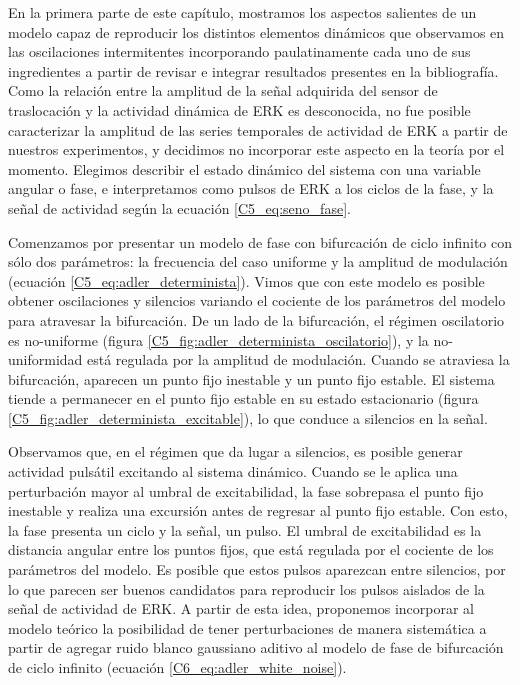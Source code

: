 \documentclass[./main.tex]{subfiles}
\begin{document}
En la primera parte de este capítulo, mostramos los aspectos salientes de un modelo capaz de reproducir los distintos elementos dinámicos que observamos en las oscilaciones intermitentes incorporando paulatinamente cada uno de sus ingredientes a partir de revisar e integrar resultados presentes en la bibliografía. Como la relación entre la amplitud de la señal adquirida del sensor de traslocación y la actividad dinámica de ERK es desconocida, no fue posible caracterizar la amplitud de las series temporales de actividad de ERK a partir de nuestros experimentos, y decidimos no incorporar este aspecto en la teoría por el momento. Elegimos describir el estado dinámico del sistema con una variable angular o fase, e interpretamos como pulsos de ERK a los ciclos de la fase, y la señal de actividad según la ecuación \ref{C5_eq:seno_fase}. 

Comenzamos por presentar un modelo de fase con bifurcación de ciclo infinito con sólo dos parámetros: la frecuencia del caso uniforme y la amplitud de modulación (ecuación \ref{C5_eq:adler_determinista}). Vimos que con este modelo es posible obtener oscilaciones y silencios variando el cociente de los parámetros del modelo para atravesar la bifurcación. De un lado de la bifurcación, el régimen oscilatorio es no-uniforme (figura \ref{C5_fig:adler_determinista_oscilatorio}), y la no-uniformidad está regulada por la amplitud de modulación. Cuando se atraviesa la bifurcación, aparecen un punto fijo inestable y un punto fijo estable. El sistema tiende a permanecer en el punto fijo estable en su estado estacionario (figura \ref{C5_fig:adler_determinista_excitable}), lo que conduce a silencios en la señal. 

Observamos que, en el régimen que da lugar a silencios, es posible generar actividad pulsátil excitando al sistema dinámico. Cuando se le aplica una perturbación mayor al umbral de excitabilidad, la fase sobrepasa el punto fijo inestable y realiza una excursión antes de regresar al punto fijo estable. Con esto, la fase presenta un ciclo y la señal, un pulso. El umbral de excitabilidad es la distancia angular entre los puntos fijos, que está regulada por el cociente de los parámetros del modelo. Es posible que estos pulsos aparezcan entre silencios, por lo que parecen ser buenos candidatos para reproducir los pulsos aislados de la señal de actividad de ERK. A partir de esta idea, proponemos incorporar al modelo teórico la posibilidad de tener perturbaciones de manera sistemática a partir de agregar ruido blanco gaussiano aditivo al modelo de fase de bifurcación de ciclo infinito \cite{Lindner2004} (ecuación \ref{C6_eq:adler_white_noise}).
\end{document}

